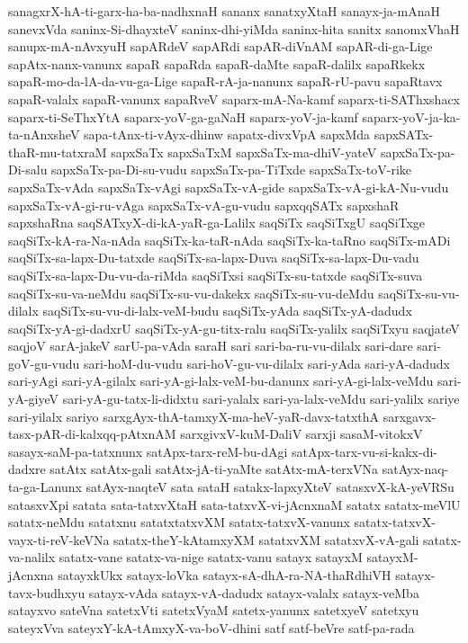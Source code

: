 {sanagxrX-hA-ti-garx-ha-ba-nadhxnaH
sananx
sanatxyXtaH
sanayx-ja-mAnaH
sanevxVda
saninx-Si-dhayxteV
saninx-dhi-yiMda
saninx-hita
sanitx
sanomxVhaH
sanupx-mA-nAvxyuH
sapARdeV
sapARdi
sapAR-diVnAM
sapAR-di-ga-Lige
sapAtx-nanx-vanunx
sapaR
sapaRda
sapaR-daMte
sapaR-dalilx
sapaRkekx
sapaR-mo-da-lA-da-vu-ga-Lige
sapaR-rA-ja-nanunx
sapaR-rU-pavu
sapaRtavx
sapaR-valalx
sapaR-vanunx
sapaRveV
saparx-mA-Na-kamf
saparx-ti-SAThxshacx
saparx-ti-SeThxYtA
saparx-yoV-ga-gaNaH
saparx-yoV-ja-kamf
saparx-yoV-ja-ka-ta-nAnxsheV
sapa-tAnx-ti-vAyx-dhinw
sapatx-divxVpA
sapxMda
sapxSATx-thaR-mu-tatxraM
sapxSaTx
sapxSaTxM
sapxSaTx-ma-dhiV-yateV
sapxSaTx-pa-Di-salu
sapxSaTx-pa-Di-su-vudu
sapxSaTx-pa-TiTxde
sapxSaTx-toV-rike
sapxSaTx-vAda
sapxSaTx-vAgi
sapxSaTx-vA-gide
sapxSaTx-vA-gi-kA-Nu-vudu
sapxSaTx-vA-gi-ru-vAga
sapxSaTx-vA-gu-vudu
sapxqqSATx
sapxshaR
sapxshaRna
saqSATxyX-di-kA-yaR-ga-Lalilx
saqSiTx
saqSiTxgU
saqSiTxge
saqSiTx-kA-ra-Na-nAda
saqSiTx-ka-taR-nAda
saqSiTx-ka-taRno
saqSiTx-mADi
saqSiTx-sa-lapx-Du-tatxde
saqSiTx-sa-lapx-Duva
saqSiTx-sa-lapx-Du-vadu
saqSiTx-sa-lapx-Du-vu-da-riMda
saqSiTxsi
saqSiTx-su-tatxde
saqSiTx-suva
saqSiTx-su-va-neMdu
saqSiTx-su-vu-dakekx
saqSiTx-su-vu-deMdu
saqSiTx-su-vu-dilalx
saqSiTx-su-vu-di-lalx-veM-budu
saqSiTx-yAda
saqSiTx-yA-dadudx
saqSiTx-yA-gi-dadxrU
saqSiTx-yA-gu-titx-ralu
saqSiTx-yalilx
saqSiTxyu
saqjateV
saqjoV
sarA-jakeV
sarU-pa-vAda
saraH
sari
sari-ba-ru-vu-dilalx
sari-dare
sari-goV-gu-vudu
sari-hoM-du-vudu
sari-hoV-gu-vu-dilalx
sari-yAda
sari-yA-dadudx
sari-yAgi
sari-yA-gilalx
sari-yA-gi-lalx-veM-bu-danunx
sari-yA-gi-lalx-veMdu
sari-yA-giyeV
sari-yA-gu-tatx-li-didxtu
sari-yalalx
sari-ya-lalx-veMdu
sari-yalilx
sariye
sari-yilalx
sariyo
sarxgAyx-thA-tamxyX-ma-heV-yaR-davx-tatxthA
sarxgavx-tasx-pAR-di-kalxqq-pAtxnAM
sarxgivxV-kuM-DaliV
sarxji
sasaM-vitokxV
sasayx-saM-pa-tatxnunx
satApx-tarx-reM-bu-dAgi
satApx-tarx-vu-si-kakx-di-dadxre
satAtx
satAtx-gali
satAtx-jA-ti-yaMte
satAtx-mA-terxVNa
satAyx-naq-ta-ga-Lanunx
satAyx-naqteV
sata
sataH
satakx-lapxyXteV
satasxvX-kA-yeVRSu
satasxvXpi
satata
sata-tatxvXtaH
sata-tatxvX-vi-jAcnxnaM
satatx
satatx-meVlU
satatx-neMdu
satatxnu
satatxtatxvXM
satatx-tatxvX-vanunx
satatx-tatxvX-vayx-ti-reV-keVNa
satatx-theY-kAtamxyXM
satatxvXM
satatxvX-vA-gali
satatx-va-nalilx
satatx-vane
satatx-va-nige
satatx-vanu
satayx
satayxM
satayxM-jAcnxna
satayxkUkx
satayx-loVka
satayx-sA-dhA-ra-NA-thaRdhiVH
satayx-tavx-budhxyu
satayx-vAda
satayx-vA-dadudx
satayx-valalx
satayx-veMba
satayxvo
sateVna
satetxVti
satetxVyaM
satetx-yanunx
satetxyeV
satetxyu
sateyxVva
sateyxY-kA-tAmxyX-va-boV-dhini
satf
satf-beVre
satf-pa-rada
}
